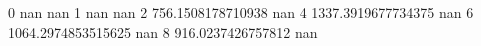 0 nan nan
1 nan nan
2 756.1508178710938 nan
4 1337.3919677734375 nan
6 1064.2974853515625 nan
8 916.0237426757812 nan
